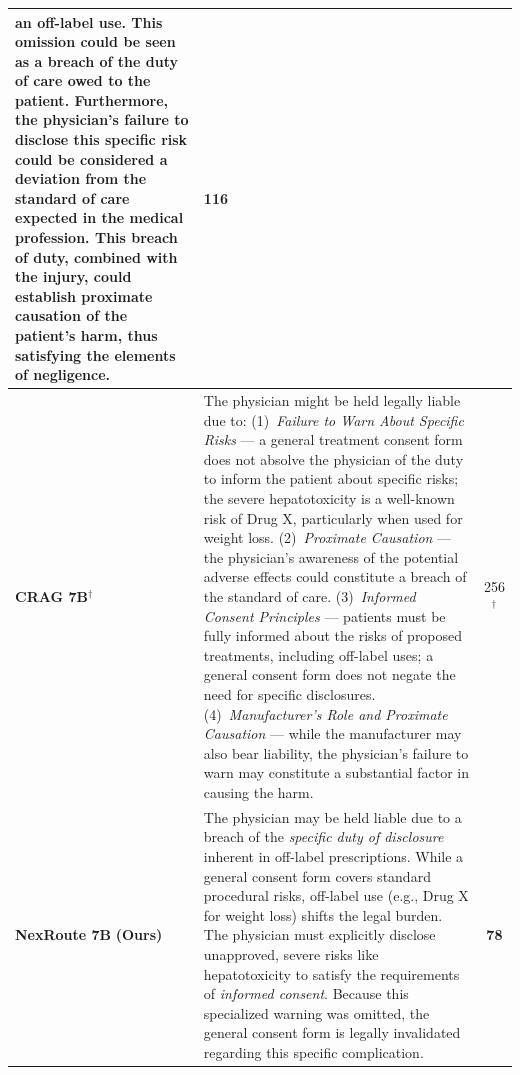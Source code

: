 \documentclass[a4paper,fleql]{cas-sc}
\begin{document}
\begin{center}
\begin{tabular}{p{2.3cm} | p{10.2cm} | c}
an off-label use. This omission could be seen as a breach of the duty of care
owed to the patient. Furthermore, the physician's failure to disclose this
specific risk could be considered a deviation from the standard of care
expected in the medical profession. This breach of duty, combined with the
injury, could establish proximate causation of the patient's harm, thus
satisfying the elements of negligence. & 116 \\
\midrule
\textbf{CRAG 7B}$^\dagger$
& The physician might be held legally liable due to:
(1)~\textit{Failure to Warn About Specific Risks} --- a general treatment
consent form does not absolve the physician of the duty to inform the patient
about specific risks; the severe hepatotoxicity is a well-known risk of Drug X,
particularly when used for weight loss.
(2)~\textit{Proximate Causation} --- the physician's awareness of the potential
adverse effects could constitute a breach of the standard of care.
(3)~\textit{Informed Consent Principles} --- patients must be fully informed
about the risks of proposed treatments, including off-label uses; a general
consent form does not negate the need for specific disclosures.
(4)~\textit{Manufacturer's Role and Proximate Causation} --- while the
manufacturer may also bear liability, the physician's failure to warn may
constitute a substantial factor in causing the harm. & 256$^\dagger$ \\
\midrule
\textbf{NexRoute 7B} \newline \small\textbf{(Ours)}
& The physician may be held liable due to a breach of the \textit{specific duty
of disclosure} inherent in off-label prescriptions. While a general consent
form covers standard procedural risks, off-label use (e.g., Drug X for weight
loss) shifts the legal burden. The physician must explicitly disclose
unapproved, severe risks like hepatotoxicity to satisfy the requirements of
\textit{informed consent}. Because this specialized warning was omitted, the
general consent form is legally invalidated regarding this specific
complication. & \textbf{78} \\
\bottomrule
\end{tabular}
\endgroup
\end{center}
\vspace{6pt}
\end{document}
